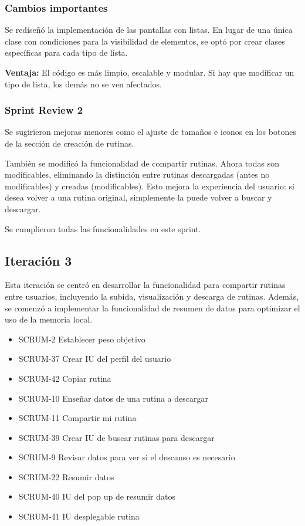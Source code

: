 \subsubsection*{Cambios importantes}
Se redise\~n\'o la implementaci\'on de las pantallas con listas. En lugar de una \'unica clase con condiciones para la visibilidad de elementos, se opt\'o por crear clases espec\'ificas para cada tipo de lista.

\textbf{Ventaja:} El c\'odigo es m\'as limpio, escalable y modular. Si hay que modificar un tipo de lista, los dem\'as no se ven afectados.

\subsubsection*{Sprint Review 2}
Se sugirieron mejoras menores como el ajuste de tama\~nos e iconos en los botones de la secci\'on de creaci\'on de rutinas.

Tambi\'en se modific\'o la funcionalidad de compartir rutinas. Ahora todas son modificables, eliminando la distinci\'on entre rutinas descargadas (antes no modificables) y creadas (modificables). Esto mejora la experiencia del usuario: si desea volver a una rutina original, simplemente la puede volver a buscar y descargar.

Se cumplieron todas las funcionalidades en este sprint.


\subsection*{Iteraci\'on 3}
Esta iteraci\'on se centr\'o en desarrollar la funcionalidad para compartir rutinas entre usuarios, incluyendo la subida, visualizaci\'on y descarga de rutinas. Adem\'as, se comenz\'o a implementar la funcionalidad de resumen de datos para optimizar el uso de la memoria local.

\begin{itemize}
  \item SCRUM-2 Establecer peso objetivo
  \item SCRUM-37 Crear IU del perfil del usuario
  \item SCRUM-42 Copiar rutina
  \item SCRUM-10 Enseñar datos de una rutina a descargar
  \item SCRUM-11 Compartir mi rutina
  \item SCRUM-39 Crear IU de buscar rutinas para descargar
  \item SCRUM-9 Revisar datos para ver si el descanso es necesario
  \item SCRUM-22 Resumir datos
  \item SCRUM-40 IU del pop up de resumir datos
  \item SCRUM-41 IU desplegable rutina
\end{itemize}

